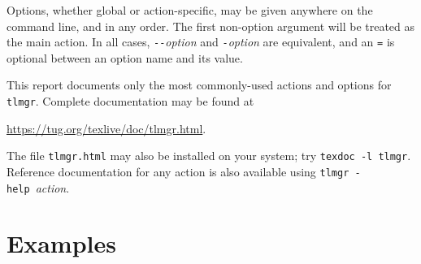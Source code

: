 \documentclass[11pt]{article}
\begin{document}
Options, whether global or action-specific, may be
given anywhere on the command line, and in any order.
The first non-option argument will be treated as the
main action. In all cases, \verb|--|\textit{option} and
\verb|-|\textit{option} are equivalent, and an \verb|=| is
optional between an option name and its value.

This report documents only the most commonly-used actions
and options for \texttt{tlmgr}. Complete documentation may
be found at
\begin{center}
  \url{https://tug.org/texlive/doc/tlmgr.html}. 
\end{center}
The file \texttt{tlmgr.html} may also be installed on your system; try \texttt{texdoc -l tlmgr}.
Reference documentation for any action is also available using 
\texttt{tlmgr  -help}~\textit{action}.

\section{Examples}
\end{document}
